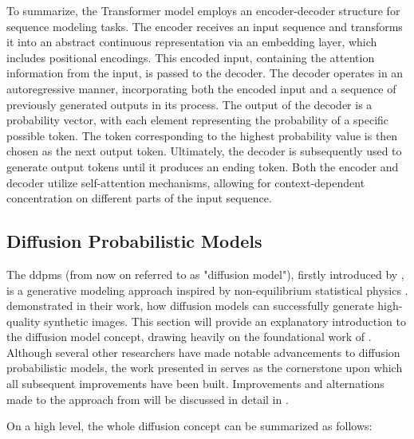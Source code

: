 To summarize, the Transformer \gls{model} employs an encoder-decoder structure for sequence modeling tasks. 
The encoder receives an input sequence and transforms it into an abstract continuous representation via an embedding layer, which includes positional encodings. 
This encoded input, containing the attention information from the input, is passed to the decoder. 
The decoder operates in an autoregressive manner, incorporating both the encoded input and a sequence of previously generated outputs in its process. 
The output of the decoder is a probability vector, with each element representing the probability of a specific possible token.
The token corresponding to the highest probability value is then chosen as the next output token.
Ultimately, the decoder is subsequently used to generate output tokens until it produces an ending token.
Both the encoder and decoder utilize self-attention mechanisms, allowing for context-dependent concentration on different parts of the input sequence.




\subsection{Diffusion Probabilistic Models}
\label{ch:preliminaries-diffusionProbabilisticModels}

The \Glspl{ddpm} (from now on referred to as "diffusion \gls{model}"), firstly introduced by \textcite{sohl-dickstein2015DeepUnsupervisedLearning}, is a generative modeling approach inspired by non-equilibrium statistical physics \cite{sohl-dickstein2015DeepUnsupervisedLearning}.
\textcite{ho2020DenoisingDiffusionProbabilistic} demonstrated in their work, how diffusion models can successfully generate high-quality synthetic images.
This section will provide an explanatory introduction to the diffusion \gls{model} concept, drawing heavily on the foundational work of \cite{ho2020DenoisingDiffusionProbabilistic}.
Although several other researchers have made notable advancements to diffusion probabilistic models, the work presented in \textcite{sohl-dickstein2015DeepUnsupervisedLearning, ho2020DenoisingDiffusionProbabilistic} 
serves as the cornerstone upon which all subsequent improvements have been built.
Improvements and alternations made to the approach from \textcite{ho2020DenoisingDiffusionProbabilistic} will be discussed in detail in .

On a high level, the whole diffusion concept can be summarized as follows:

